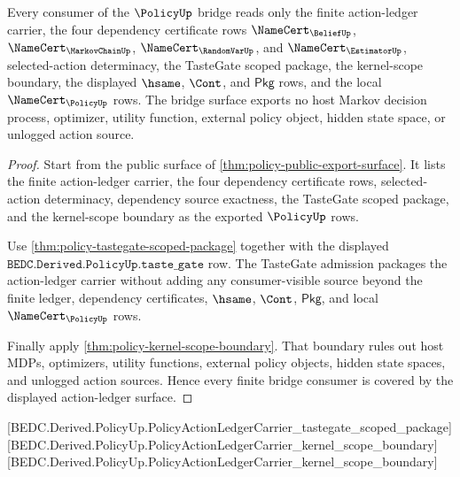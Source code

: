 \begin{theorem}
\label{thm:policy-action-ledger-finite-consumer-coverage}
Every consumer of the $\PolicyUp$ bridge reads only the finite action-ledger
carrier, the four dependency certificate rows $\NameCert_{\BeliefUp}$,
$\NameCert_{\MarkovChainUp}$, $\NameCert_{\RandomVarUp}$, and
$\NameCert_{\EstimatorUp}$, selected-action determinacy, the TasteGate scoped
package, the kernel-scope boundary, the displayed $\hsame$, $\Cont$, and
$\mathsf{Pkg}$ rows, and the local $\NameCert_{\PolicyUp}$ rows. The bridge
surface exports no host Markov decision process, optimizer, utility function,
external policy object, hidden state space, or unlogged action source.
\end{theorem}
\begin{proof}
Start from the public surface of \autoref{thm:policy-public-export-surface}. It
lists the finite action-ledger carrier, the four dependency certificate rows,
selected-action determinacy, dependency source exactness, the TasteGate scoped
package, and the kernel-scope boundary as the exported $\PolicyUp$ rows.

Use \autoref{thm:policy-tastegate-scoped-package} together with the displayed
$\texttt{BEDC.Derived.PolicyUp.taste\_gate}$ row. The TasteGate admission
packages the action-ledger carrier without adding any consumer-visible source
beyond the finite ledger, dependency certificates, $\hsame$, $\Cont$,
$\mathsf{Pkg}$, and local $\NameCert_{\PolicyUp}$ rows.

Finally apply \autoref{thm:policy-kernel-scope-boundary}. That boundary rules
out host MDPs, optimizers, utility functions, external policy objects, hidden
state spaces, and unlogged action sources. Hence every finite bridge consumer
is covered by the displayed action-ledger surface.
\end{proof}

[BEDC.Derived.PolicyUp.PolicyActionLedgerCarrier\_tastegate\_scoped\_package]
[BEDC.Derived.PolicyUp.PolicyActionLedgerCarrier\_kernel\_scope\_boundary]
[BEDC.Derived.PolicyUp.PolicyActionLedgerCarrier\_kernel\_scope\_boundary]

